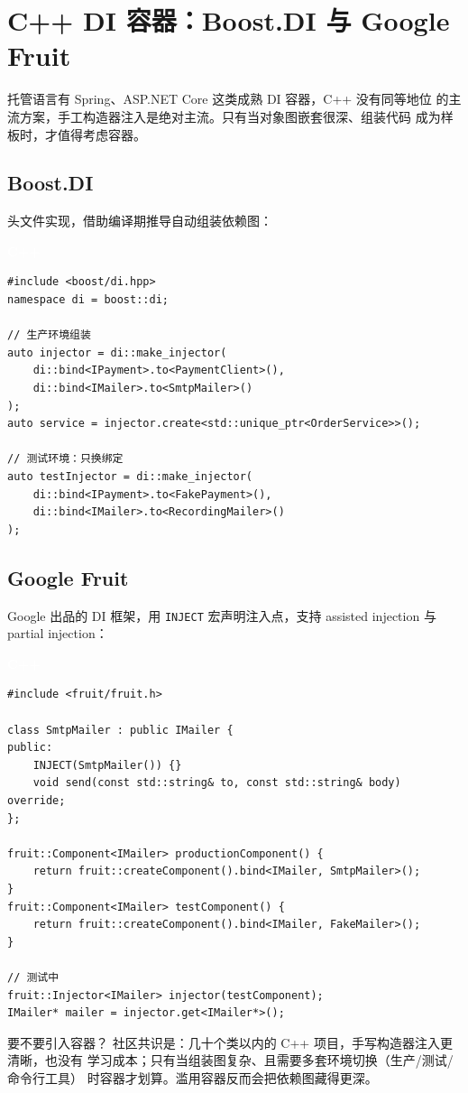 \documentclass[12pt,a4paper,fontset=fandol]{ctexbook}
\newcommand{\cpplabel}{%
  \begin{tcolorbox}[enhanced,colback=cppheadbg,colframe=cppheadbg,
    arc=1mm,boxrule=0mm,left=6pt,right=6pt,top=2pt,bottom=2pt,
    halign=left,oversize]
    \textcolor{white}{\small\bfseries C++}
  \end{tcolorbox}\vspace{-4pt}}
\begin{document}
\section{C++ DI 容器：Boost.DI 与 Google Fruit}

托管语言有 Spring、ASP.NET Core 这类成熟 DI 容器，C++ 没有同等地位
的主流方案，手工构造器注入是绝对主流。只有当对象图嵌套很深、组装代码
成为样板时，才值得考虑容器。

\subsection{Boost.DI}

头文件实现，借助编译期推导自动组装依赖图：

\cpplabel
\begin{lstlisting}
#include <boost/di.hpp>
namespace di = boost::di;

// 生产环境组装
auto injector = di::make_injector(
    di::bind<IPayment>.to<PaymentClient>(),
    di::bind<IMailer>.to<SmtpMailer>()
);
auto service = injector.create<std::unique_ptr<OrderService>>();

// 测试环境：只换绑定
auto testInjector = di::make_injector(
    di::bind<IPayment>.to<FakePayment>(),
    di::bind<IMailer>.to<RecordingMailer>()
);
\end{lstlisting}

\subsection{Google Fruit}

Google 出品的 DI 框架，用 \texttt{INJECT} 宏声明注入点，支持
assisted injection 与 partial injection：

\cpplabel
\begin{lstlisting}
#include <fruit/fruit.h>

class SmtpMailer : public IMailer {
public:
    INJECT(SmtpMailer()) {}
    void send(const std::string& to, const std::string& body) override;
};

fruit::Component<IMailer> productionComponent() {
    return fruit::createComponent().bind<IMailer, SmtpMailer>();
}
fruit::Component<IMailer> testComponent() {
    return fruit::createComponent().bind<IMailer, FakeMailer>();
}

// 测试中
fruit::Injector<IMailer> injector(testComponent);
IMailer* mailer = injector.get<IMailer*>();
\end{lstlisting}

\begin{note}{要不要引入容器？}
社区共识是：几十个类以内的 C++ 项目，手写构造器注入更清晰，也没有
学习成本；只有当组装图复杂、且需要多套环境切换（生产/测试/命令行工具）
时容器才划算。滥用容器反而会把依赖图藏得更深。
\end{note}
\end{document}
